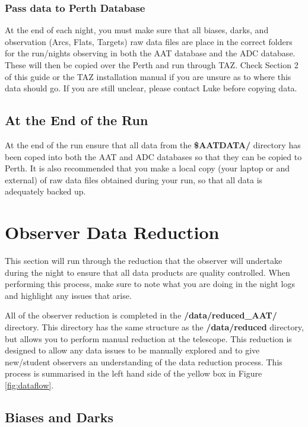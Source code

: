 \documentclass[12pt]{article}
\begin{document}
\subsubsection{Pass data to Perth Database}

At the end of each night, you must make sure that all biases, darks, and observation (Arcs, Flats, Targets) raw data files are place in the correct folders for the run/nights observing in both the AAT database and the ADC database. These will then be copied over the Perth and run through TAZ. Check Section 2 of this guide or the TAZ installation manual if you are unsure as to where this data should go. If you are still unclear, please contact Luke before copying data.  


\subsection{At the End of the Run}

At the end of the run ensure that all data from the \textbf{\$AATDATA/} directory has been coped into both the AAT and ADC databases so that they can be copied to Perth. It is also recommended that you make a local copy (your laptop or and external) of raw data files obtained during your run, so that all data is adequately backed up.  

\section{Observer Data Reduction}
\label{sec:Reduc}

This section will run through the reduction that the observer will undertake during the night to ensure that all data products are quality controlled. When performing this process, make sure to note what you are doing in the night logs and highlight any issues that arise.

All of the observer reduction is completed in the \textbf{/data/reduced\_AAT/} directory. This directory has the same structure as the \textbf{/data/reduced} directory, but allows you to perform manual reduction at the telescope. This reduction is designed to allow any data issues to be manually explored and to give new/student observers an understanding of the data reduction process. This process is summarised in the left hand side of the yellow box in Figure \ref{fig:dataflow}.   

\subsection{Biases and Darks}
\end{document}
